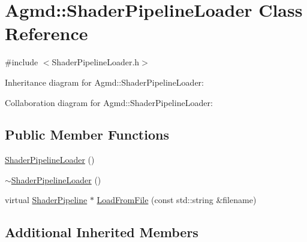\hypertarget{class_agmd_1_1_shader_pipeline_loader}{\section{Agmd\+:\+:Shader\+Pipeline\+Loader Class Reference}
\label{class_agmd_1_1_shader_pipeline_loader}
}


{\ttfamily \#include $<$Shader\+Pipeline\+Loader.\+h$>$}



Inheritance diagram for Agmd\+:\+:Shader\+Pipeline\+Loader\+:


Collaboration diagram for Agmd\+:\+:Shader\+Pipeline\+Loader\+:
\subsection*{Public Member Functions}
\begin{DoxyCompactItemize}
\item 
\hyperlink{class_agmd_1_1_shader_pipeline_loader_ae4b22c4ac387390341f9e2cff7ff4da5}{Shader\+Pipeline\+Loader} ()
\item 
\hyperlink{class_agmd_1_1_shader_pipeline_loader_abb4ef5fb728bf9fdbd866536fa56c938}{$\sim$\+Shader\+Pipeline\+Loader} ()
\item 
virtual \hyperlink{class_agmd_1_1_shader_pipeline}{Shader\+Pipeline} $\ast$ \hyperlink{class_agmd_1_1_shader_pipeline_loader_a246cb263a2b7396ac8ce2d60ff81b065}{Load\+From\+File} (const std\+::string \&filename)
\end{DoxyCompactItemize}
\subsection*{Additional Inherited Members}


